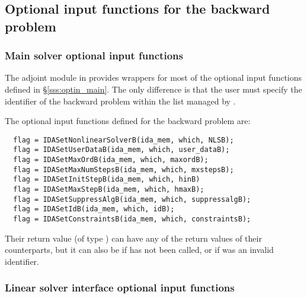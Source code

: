 \subsection{Optional input functions for the backward problem}
\label{ss:optional_input_b}
\subsubsection{Main solver optional input functions}

The adjoint module in {\idas} provides wrappers for most of the optional
input functions defined in \S\ref{sss:optin_main}. The only difference is
that the user must specify the identifier  of the backward problem
within the list managed by {\idas}.

The optional input functions defined for the backward problem are:
\begin{verbatim}
  flag = IDASetNonlinearSolverB(ida_mem, which, NLSB);
  flag = IDASetUserDataB(ida_mem, which, user_dataB);
  flag = IDASetMaxOrdB(ida_mem, which, maxordB);
  flag = IDASetMaxNumStepsB(ida_mem, which, mxstepsB);
  flag = IDASetInitStepB(ida_mem, which, hinB)
  flag = IDASetMaxStepB(ida_mem, which, hmaxB);
  flag = IDASetSuppressAlgB(ida_mem, which, suppressalgB);
  flag = IDASetIdB(ida_mem, which, idB);
  flag = IDASetConstraintsB(ida_mem, which, constraintsB);
\end{verbatim}
Their return value  (of type ) can have any of the return values
of their counterparts, but it can also be  if 
has not been called, or  if  was an invalid identifier.


\subsubsection{Linear solver interface optional input functions}


